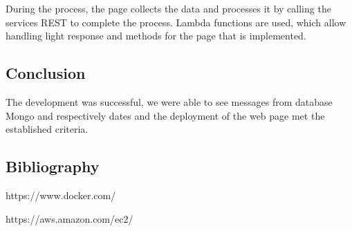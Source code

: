 \documentclass[
	12pt, %
]{fphw}
\begin{document}
During the process, the page collects the data and processes it by calling the services REST to complete the process.
Lambda functions are used, which allow handling light response and methods for the page that is implemented.

\subsection * {Conclusion}

The development was successful, we were able to see messages from database Mongo and respectively dates and the deployment of the web page met the established criteria.


\subsection * {Bibliography}


https://www.docker.com/

https://aws.amazon.com/ec2/
\end{document}
